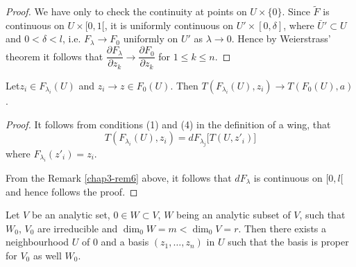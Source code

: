 \begin{proof}%
  We have only to check the continuity at points on $U \times
  \{0\}$. Since $\widetilde{F}$ is continuous on $U \times [0,1
    [$, it is uniformly continuous on $U' \times [0,\delta]$, where $
      \bar{U}' \subset U$ and $0 < \delta < l$, i.e. $F_{\lambda}
      \to F_{0}$ uniformly on $ U'$ as $\lambda
      \to 0$. Hence by Weierstrass' theorem it follows that
      $\dfrac{\partial F_{\lambda}}{\partial z_{k}} \to
      \dfrac{\partial F_{0}}{\partial z_{k}}$ for $1 \leq k
      \leq n$. 
\end{proof}

\begin{remark}\label{chap3-rem7} %
  Let\pageoriginale $z_{i} \in F_{\lambda_{i}} (U)$ and  $z_{i} \to
  z \in F_{0}(U)$. Then   
  $T(F_{\lambda_{i}} (U), z_{i}) \to T(F_{0} (U), a)$.
\end{remark}

\begin{proof}%
  It follows from conditions (1) and (4) in the definition of a wing, that
  $$ 
  T(F_{\lambda_{i}}(U), z_{i}) = dF_{\lambda_{j}}\big[T(U, z'_{i})\big]
  $$
  where $F_{\lambda_{i}}(z'_{i}) = z_{i}$.


From the Remark \ref{chap3-rem6} above, it follows that $dF_{\lambda}$ is
continuous on $[0,l[$ and hence follows the proof. 
\end{proof}

\setcounter{lemma}{0}
\begin{lemma}\label{chap3-lem1}
  Let $V$ be an analytic set, $0 \in W \subset V$, $W$ being an
  analytic subset of $V$, such that $W_{0}$, $V_{0}$ are
  irreducible and $\dim_{0} W = m< \dim_{0} V = r$. 
  Then there exists a neighbourhood $U$ of $0$ and a basis $(z_{1},
  \ldots , z_{n})$ in $U$ such that the basis is proper for $V_{0}$ as
  well $W_{0}$.  
\end{lemma}

